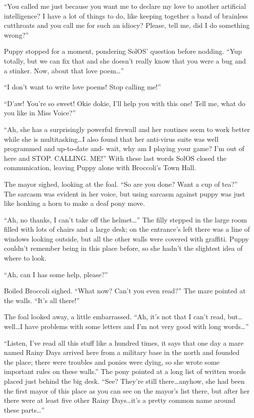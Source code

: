 ``You called me just because you want me to declare my love to another artificial intelligence? I have a lot of things to do, like keeping together a band of brainless cutthroats and you call me for such an idiocy? Please, tell me, did I do something wrong?''

Puppy stopped for a moment, pondering SolOS' question before nodding. ``Yup totally, but we can fix that and she doesn't really know that you were a bug and a stinker. Now, about that love poem\dots''

``I don't want to write love poems! Stop calling me!''

``D'aw! You're so sweet! Okie dokie, I'll help you with this one! Tell me, what do you like in Miss Voice?''

``Ah, she has a surprisingly powerful firewall and her routines seem to work better while she is multitasking\dots I also found that her anti-virus suite was well programmed and up-to-date and- wait, why am I playing your game? I'm out of here and STOP. CALLING. ME!'' With these last words SolOS closed the communication, leaving Puppy alone with Broccoli's Town Hall.

The mayor sighed, looking at the foal. ``So are you done? Want a cup of tea?'' The sarcasm was evident in her voice, but using sarcasm against puppy was just like honking a horn to make a deaf pony move.

``Ah, no thanks, I can't take off the helmet\dots'' The filly stepped in the large room filled with lots of chairs and a large desk; on the entrance's left there was a line of windows looking outside, but all the other walls were covered with graffiti. Puppy couldn't remember being in this place before, so she hadn't the slightest idea of where to look.

``Ah, can I has some help, please?''

Boiled Broccoli sighed. ``What now? Can't you even read?'' The mare pointed at the walls. ``It's all there!''

The foal looked away, a little embarrassed. ``Ah, it's not that I can't read, but\dots well\dots I have problems with some letters and I'm not very good with long words\dots''

``Listen, I've read all this stuff like a hundred times, it says that one day a mare named Rainy Days arrived here from a military base in the north and founded the place; there were troubles and ponies were dying, so she wrote some important rules on these walls.'' The pony pointed at a long list of written words placed just behind the big desk. ``See? They're still there\dots anyhow, she had been the first mayor of this place as you can see on the mayor's list there, but after her there were at least five other Rainy Days\dots it's a pretty common name around these parts\dots''

